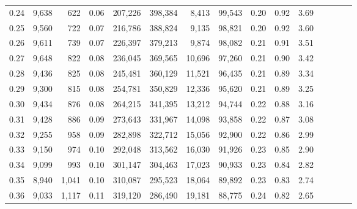\begin{tabular}{rrrcrrrrrrrrrrr}
0.24 &   9,638 &    622 &                                       0.06 &  207,226 &  398,384 &    8,413 &   99,543 &  0.20 &  0.92 &                         3.69 \\
0.25 &   9,560 &    722 &                                       0.07 &  216,786 &  388,824 &    9,135 &   98,821 &  0.20 &  0.92 &                         3.60 \\
0.26 &   9,611 &    739 &                                       0.07 &  226,397 &  379,213 &    9,874 &   98,082 &  0.21 &  0.91 &                         3.51 \\
0.27 &   9,648 &    822 &                                       0.08 &  236,045 &  369,565 &   10,696 &   97,260 &  0.21 &  0.90 &                         3.42 \\
0.28 &   9,436 &    825 &                                       0.08 &  245,481 &  360,129 &   11,521 &   96,435 &  0.21 &  0.89 &                         3.34 \\
0.29 &   9,300 &    815 &                                       0.08 &  254,781 &  350,829 &   12,336 &   95,620 &  0.21 &  0.89 &                         3.25 \\
0.30 &   9,434 &    876 &                                       0.08 &  264,215 &  341,395 &   13,212 &   94,744 &  0.22 &  0.88 &                         3.16 \\
0.31 &   9,428 &    886 &                                       0.09 &  273,643 &  331,967 &   14,098 &   93,858 &  0.22 &  0.87 &                         3.08 \\
0.32 &   9,255 &    958 &                                       0.09 &  282,898 &  322,712 &   15,056 &   92,900 &  0.22 &  0.86 &                         2.99 \\
0.33 &   9,150 &    974 &                                       0.10 &  292,048 &  313,562 &   16,030 &   91,926 &  0.23 &  0.85 &                         2.90 \\
0.34 &   9,099 &    993 &                                       0.10 &  301,147 &  304,463 &   17,023 &   90,933 &  0.23 &  0.84 &                         2.82 \\
0.35 &   8,940 &  1,041 &                                       0.10 &  310,087 &  295,523 &   18,064 &   89,892 &  0.23 &  0.83 &                         2.74 \\
0.36 &   9,033 &  1,117 &                                       0.11 &  319,120 &  286,490 &   19,181 &   88,775 &  0.24 &  0.82 &                         2.65 \\

\end{tabular}

